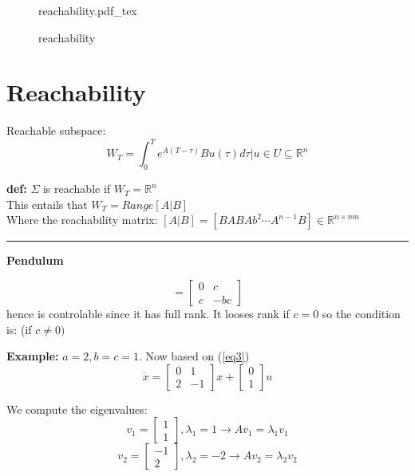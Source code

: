 \documentclass[a4paper]{article}
\newcommand{\incfig}[2][1]{%
    \def\svgwidth{#1\columnwidth}
    {#2.pdf_tex}
}
\begin{document}
\begin{figure}[ht]
    \centering
    \incfig[1]{reachability}
    \caption{reachability}
    \label{fig:reachability}
\end{figure}

\newpage


\section{Reachability}

Reachable subspace:
\begin{equation}
W_T = { \int_{0}^{T} e^{A(T-\tau)} Bu(\tau) d\tau | u \in U} \subseteq \mathbb{R}^{n} 
\end{equation}


\textbf{def:} 
$ \Sigma $ is reachable if $  W_T = \mathbb{R}^{n} $ \\
This entails that $ W_T = Range[A|B]$ \\
Where the reachability matrix: $ [A|B] = [B AB Ab^{2} \cdots A^{n-1}B] \in \mathbb{R}^{n \times nm}  $

\hfill {}

\vspace{5pt}
\hrule
\vspace{5pt}
\textbf{Pendulum} 


\begin{equation}
	[A|B] = \begin{bmatrix}
	0 & c \\
	c & -bc
	\end{bmatrix}
\end{equation}
hence is controlable since it has full rank. It looses rank if $ c = 0$ so the condition is:   (if $ c \neq 0) $

\textbf{Example:}  
$ a = 2, b = c = 1 $.
Now based on (\ref{eq3})
\[
\dot{x} = \begin{bmatrix}
0 & 1 \\
2 & -1
\end{bmatrix}x + \begin{bmatrix}
0 \\
1
\end{bmatrix} u
\] 


We compute the eigenvalues:
\[
v_1 = \begin{bmatrix}
1 \\
1
\end{bmatrix}, \lambda_1 = 1 \rightarrow  Av_1 = \lambda_1 v_1
\] 
\[
v_2 = \begin{bmatrix}
-1 \\
2
\end{bmatrix}, \lambda_2 = -2 \rightarrow  Av_2 = \lambda_2 v_2
\] 
\end{document}
